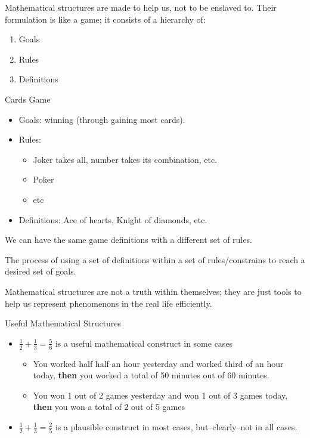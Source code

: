 Mathematical structures are made to help us, not to be enslaved to.
Their formulation is like a game; it consists of a hierarchy of:
\begin{enumerate}
    \item Goals
    \item Rules
    \item Definitions
\end{enumerate}

\begin{example}
    Cards Game
    \begin{itemize}
        \item Goals: winning (through gaining most cards).
        \item Rules:
            \begin{itemize}
                \item Joker takes all, number takes its combination, etc.
                    \item Poker
                    \item etc
            \end{itemize}
        \item Definitions: Ace of hearts, Knight of diamonds, etc.
    \end{itemize}
\end{example}

\begin{note}
    We can have the same game definitions with a different set of rules.
\end{note}

\begin{definition}[Logic]
    The process of using a set of definitions within a set of rules/constrains to reach a desired set of goals.
\end{definition}

\begin{note}
    Mathematical structures are not a truth within themselves; they are just tools to help us represent phenomenons in the real life efficiently.
\end{note}
\begin{example}
    Useful Mathematical Structures
    \begin{itemize}
        \item $\frac{1}{2}+\frac{1}{3}=\frac{5}{6}$ is a useful mathematical construct in some cases
            \begin{itemize}
                \item You worked half half an hour yesterday and worked third of an hour today, \textbf{then} you worked a total of 50 minutes out of 60 minutes.
                \item You won 1 out of 2 games yesterday and won 1 out of 3 games today, \textbf{then} you won a total of 2 out of 5 games
            \end{itemize}
        \item $\frac{1}{2}+\frac{1}{3}=\frac{2}{5}$ is a plausible construct in most cases, but--clearly--not in all cases.
    \end{itemize}
\end{example}

